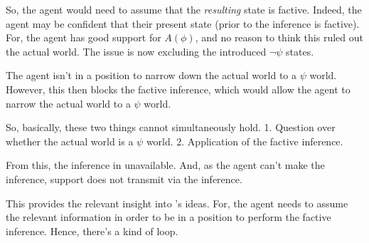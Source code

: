 \documentclass[10pt]{article}
\begin{document}
\begin{note}
  So, the agent would need to assume that the \emph{resulting} state is factive.
  Indeed, the agent may be confident that their present state (prior to the inference is factive).
  For, the agent has good support for \(A(\phi)\), and no reason to think this ruled out the actual world.
  The issue is now excluding the introduced \(\lnot\psi\) states.

  The agent isn't in a position to narrow down the actual world to a \(\psi\) world.
  However, this then blocks the factive inference, which would allow the agent to narrow the actual world to a \(\psi\) world.

  So, basically, these two things cannot simultaneously hold.
  1. Question over whether the actual world is a \(\psi\) world.
  2. Application of the factive inference.

  From this, the inference in unavailable.
  And, as the agent can't make the inference, support does not transmit via the inference.

  This provides the relevant insight into \citeauthor{Wright:2003aa}'s ideas.
  For, the agent needs to assume the relevant information in order to be in a position to perform the factive inference.
  Hence, there's a kind of loop.
\end{note}
\end{document}

